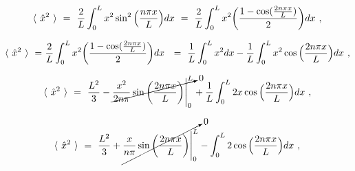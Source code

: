 \documentclass{article}
\begin{document}
\begin{equation} \label{eq:255}
\langle \hspace{0.125cm} \hat{x}^{2} \hspace{0.125cm} \rangle \hspace{0.125cm} = \hspace{0.125cm} \frac{2}{L} \int_{0}^{L} x^2 \sin^{2}\Big(\frac{n\pi x}{L}\Big) dx \hspace{0.125cm} = \hspace{0.125cm} \frac{2}{L} \int_{0}^{L} x^2 \bigg( \frac{1 - \cos(\frac{2 n \pi x}{L})}{2} \bigg) dx \hspace{0.125cm} ,
\end{equation}

\begin{equation} \label{eq:255}
\langle \hspace{0.125cm} \hat{x}^{2} \hspace{0.125cm} \rangle \hspace{0.125cm} = \hspace{0.0125cm} \frac{2}{L} \int_{0}^{L} x^2 \bigg( \frac{1 - \cos(\frac{2 n \pi x}{L})}{2} \bigg) dx \hspace{0.125cm} \hspace{0.125cm} = \hspace{0.125cm} \frac{1}{L} \int_{0}^{L} x^2 dx - \frac{1}{L} \int_{0}^{L} x^2 \cos\Big(\frac{2 n \pi x}{L}\Big) dx \hspace{0.125cm},
\end{equation}

\begin{equation} \label{eq:255}
\langle \hspace{0.125cm} \hat{x}^{2} \hspace{0.125cm} \rangle \hspace{0.125cm} = \hspace{0.125cm} \frac{L^2}{3} - \cancelto{0}{\frac{x^2}{2 n \pi}\sin\bigg(\frac{2 n \pi x}{L}\bigg) \Bigg|_{0}^{L}} + \frac{1}{L} \int_{0}^{L} 2 x \cos\Big(\frac{2 n \pi x}{L}\Big) dx \hspace{0.125cm} ,
\end{equation}

\begin{equation} \label{eq:255}
\langle \hspace{0.125cm} \hat{x}^{2} \hspace{0.125cm} \rangle \hspace{0.125cm} = \hspace{0.125cm} \frac{L^2}{3} + \cancelto{0}{\frac{x}{n \pi} \sin\bigg(\frac{2 n \pi x}{L}\bigg) \Bigg|_{0}^{L}} - \int_{0}^{L} 2 \cos\Big(\frac{2 n \pi x}{L}\Big) dx \hspace{0.125cm} ,
\end{equation}
\end{document}
